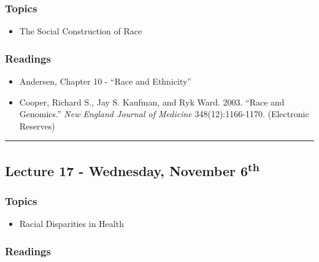 \documentclass[]{book}
\providecommand{\tightlist}{%
  \setlength{\itemsep}{0pt}\setlength{\parskip}{0pt}}
\begin{document}
\hypertarget{topics-20}{%
\subsubsection*{Topics}\label{topics-20}}

\begin{itemize}
\tightlist
\item
  The Social Construction of Race
\end{itemize}

\hypertarget{readings-18}{%
\subsubsection*{Readings}\label{readings-18}}

\begin{itemize}
\tightlist
\item
  Andersen, Chapter 10 - ``Race and Ethnicity''
\item
  Cooper, Richard S., Jay S. Kaufman, and Ryk Ward. 2003. ``Race and Genomics.'' \emph{New England Journal of Medicine} 348(12):1166-1170. (Electronic Reserves)
\end{itemize}

\begin{center}\rule{0.5\linewidth}{\linethickness}\end{center}

\hypertarget{lecture-17---wednesday-november-6th}{%
\subsection*{\texorpdfstring{Lecture 17 - Wednesday, November 6\textsuperscript{th}}{Lecture 17 - Wednesday, November 6th}}\label{lecture-17---wednesday-november-6th}}

\hypertarget{topics-21}{%
\subsubsection*{Topics}\label{topics-21}}

\begin{itemize}
\tightlist
\item
  Racial Disparities in Health
\end{itemize}

\hypertarget{readings-19}{%
\subsubsection*{Readings}\label{readings-19}}
\end{document}
